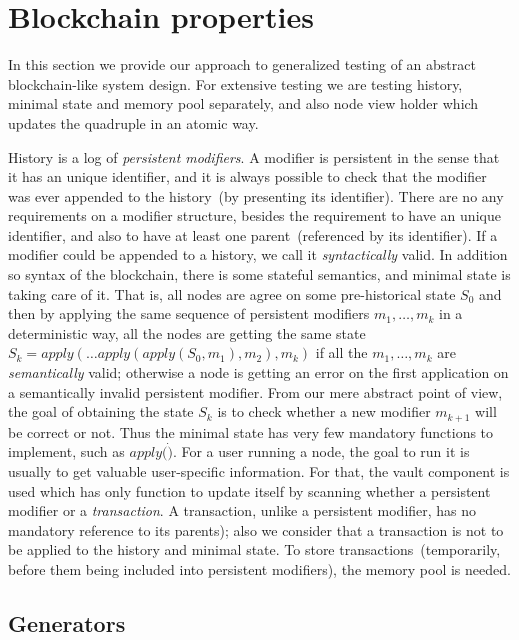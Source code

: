 
\section{Blockchain properties}
\label{sec:props}

In this section we provide our approach to generalized testing of an abstract blockchain-like system design. For extensive testing we are  testing history, minimal state and memory pool separately, and also node view holder which updates the quadruple {\em <history, minimal state, vault, memory pool>} in an atomic way.

History is a log of {\em persistent modifiers}. A modifier is persistent in the sense that it has an unique identifier, and it is always possible to check that the modifier was ever appended to the history~(by presenting its identifier). There are no any requirements on a modifier structure, besides the requirement to have an unique identifier, and also to have at least one parent~(referenced by its identifier). If a modifier could be appended to a history, we call it {\em syntactically} valid. In addition so syntax of the blockchain, there is some stateful semantics, and minimal state is taking care of it. That is, all nodes are agree on some pre-historical state $S_0$ and then by applying the same sequence of persistent modifiers $m_1, \ldots, m_k$ in a deterministic way, all the nodes are getting the same state $S_k = apply(\ldots apply(apply(S_0, m_1), m_2), m_k)$ if all the $m_1, \ldots, m_k$ are {\em semantically} valid; otherwise a node is getting an error on the first application on a semantically invalid persistent modifier. From our mere abstract point of view, the goal of obtaining the state $S_k$ is to check whether a new modifier $m_{k+1}$ will be correct or not. Thus the minimal state has very few mandatory functions to implement, such as $apply(\dot)$. For a user running a node, the goal to run it is usually to get valuable user-specific information. For that, the vault component is used which has only function to update itself by scanning whether a persistent modifier or a {\em transaction}. A transaction, unlike a persistent modifier, has no mandatory reference to its parents); also we consider that a transaction is not to be applied to the history and minimal state. To store transactions~(temporarily, before them being included into persistent modifiers), the memory pool is needed.      


\subsection{Generators}

